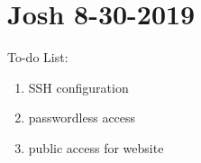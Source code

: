 \section{Josh 8-30-2019}

To-do List:
\begin{enumerate}
\item SSH configuration
\item passwordless access
\item public access for website
\end{enumerate}
